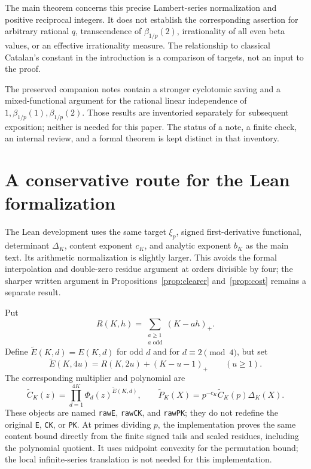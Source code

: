 \documentclass[11pt,letterpaper]{article}
\numberwithin{equation}{section}
\theoremstyle{remark}\newtheorem{remark}[theorem]{Remark}
\begin{document}
The main theorem concerns this precise Lambert-series normalization and positive reciprocal integers. It does not establish the corresponding assertion for arbitrary rational $q$, transcendence of $\beta_{1/p}(2)$, irrationality of all even beta values, or an effective irrationality measure. The relationship to classical Catalan's constant in the introduction is a comparison of targets, not an input to the proof.

The preserved companion notes contain a stronger cyclotomic saving and a mixed-functional argument for the rational linear independence of $1,\beta_{1/p}(1),\beta_{1/p}(2)$. Those results are inventoried separately for subsequent exposition; neither is needed for this paper. The status of a note, a finite check, an internal review, and a formal theorem is kept distinct in that inventory.

\appendix
\section{A conservative route for the Lean formalization}\label{app:lean}
The Lean development uses the same target $\xi_p$, signed first-derivative
functional, determinant $\Delta_K$, content exponent $c_K$, and analytic
exponent $b_K$ as the main text. Its arithmetic normalization is slightly
larger. This avoids the formal interpolation and double-zero residue argument
at orders divisible by four; the sharper written argument in
Propositions~\ref{prop:clearer} and~\ref{prop:cost} remains a separate result.

Put
\begin{equation*}
 R(K,h)=\sum_{\substack{a\ge1\\a\text{ odd}}}(K-ah)_+.
\end{equation*}
Define $\widetilde E(K,d)=E(K,d)$ for odd $d$ and for $d\equiv2\pmod4$, but set
\begin{equation}\label{eq:leanrawexponent}
 \widetilde E(K,4u)=R(K,2u)+(K-u-1)_+\qquad(u\ge1).
\end{equation}
The corresponding multiplier and polynomial are
\begin{equation*}
 \widetilde C_K(z)=\prod_{d=1}^{4K}\Phi_d(z)^{\widetilde E(K,d)},
 \qquad
 \widetilde P_K(X)=p^{-c_K}\widetilde C_K(p)\Delta_K(X).
\end{equation*}
These objects are named \texttt{rawE}, \texttt{rawCK}, and \texttt{rawPK};
they do not redefine the original \texttt{E}, \texttt{CK}, or \texttt{PK}.
At primes dividing $p$, the implementation proves the same content bound
directly from the finite signed tails and scaled residues, including the
polynomial quotient. It uses midpoint convexity for the permutation bound;
the local infinite-series translation is not needed for this implementation.
\end{document}
